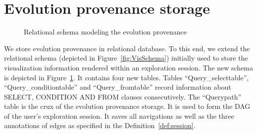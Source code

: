  
 
 \section{Evolution provenance storage}
 \label{app:evoDM-storage}
 
 	 \begin{figure}[t]
\centering
\caption{Relational schema modeling the evolution provenance}
\label{fig:SchemaEvo}
\end{figure}	

We store evolution provenance in relational database. To this end, we extend the relational schema (depicted in Figure~\ref{fig:VisSchema}) initially used to store the visualization information rendered within an exploration session.
The new schema is depicted in Figure~\ref{fig:SchemaEvo}.
It contains four new tables. Tables ``Query\_selecttable'', ``Query\_conditiontable'' and ``Query\_fromtable'' record information about SELECT, CONDITION AND FROM clauses consecutively. 
The ``Querypath'' table is the crux of the evolution provenance storage. It is used to form the DAG of the user's exploration session. It saves all navigations as well as the three annotations of edges as specified in the Definition~\ref{def:session}.

